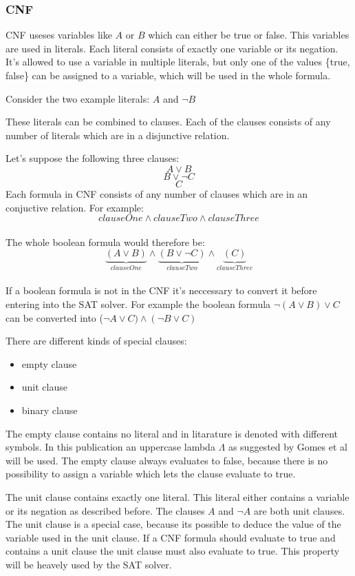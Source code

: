 \subsubsection{CNF}
CNF useses variables like $A$ or $B$ which can either be true or false.
This variables are used in literals. Each literal consists of exactly one variable or its negation. It's allowed to use a variable in multiple literals, but only one of the values \{true, false\} can be assigned to a variable, which will be used in the whole formula.

Consider the two example literals: $A$ and $\lnot B$

These literals can be combined to clauses. Each of the clauses consists of any number of literals which are in a disjunctive relation. 

Let's suppose the following three clauses: 
$$A \lor B$$
$$B \lor \lnot C$$ 
$$C$$
Each formula in CNF consists of any number of clauses which are in an conjuctive relation. For example: $$clauseOne \land clauseTwo \land clauseThree$$\\
The whole boolean formula would therefore be: $$\underbrace{(A \lor B)}_{clauseOne} \land \underbrace{(B \lor \lnot C)}_{clauseTwo} \land \underbrace{(C)}_{clauseThree}$$\\

If a boolean formula is not in the CNF it's neccessary to convert it before entering into the SAT solver. For example the boolean formula $\lnot(A \lor B) \lor C$ can be converted into ($\lnot A \lor C) \land (\lnot B \lor C)$

There are different kinds of special clauses:
\begin{itemize}
\item empty clause
\item unit clause
\item binary clause
\end{itemize}
The empty clause contains no literal and in litarature is denoted with different symbols. In this publication an uppercase lambda $\Lambda$  as suggested by Gomes et al \cite{Gomes2008SatisfiabilityS} will be used.
The empty clause always evaluates to false, because there is no possibility to assign a variable which lets the clause evaluate to true.

The unit clause contains exactly one literal. This literal either contains a variable or its negation as described before. 
The clauses $A$ and $\lnot A$ are both unit clauses. 
The unit clause is a special case, because its possible to deduce the value of the variable used in the unit clause.
If a CNF formula should evaluate to true and contains a unit clause the unit clause must also evaluate to true. 
This property will be heavely used by the SAT solver.

